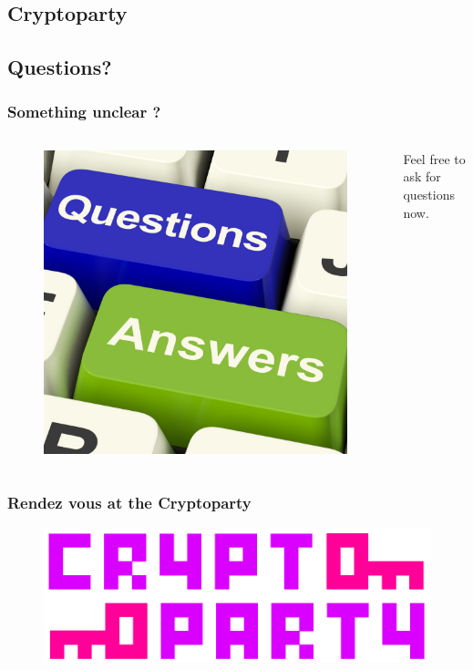 \documentclass{beamer}
\begin{document}
\subsection{Cryptoparty}
\begin{frame}
\end{frame}

\subsection{Questions?}
\begin{frame}
\frametitle{Something unclear ?}
\begin{columns}[c]
\begin{figure}
\includegraphics[width=0.8\linewidth]{./materials/questions}
\end{figure}
Feel free to ask for questions now.
\end{columns}
\end{frame}

\begin{frame}
\frametitle{Rendez vous at the Cryptoparty}
\begin{figure}
\includegraphics[width=0.8\linewidth]{./materials/cryptoparty}
\end{figure}
\end{frame}
\end{document}
